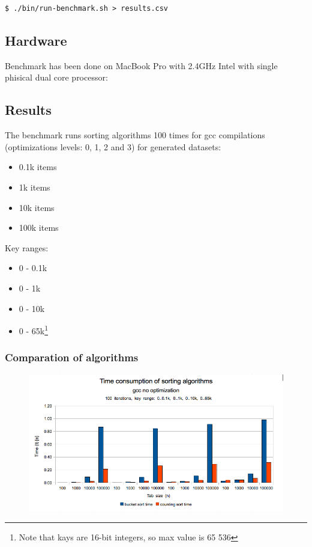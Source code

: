 \documentclass[12pt]{article}
\begin{document}
\begin{lstlisting}
$ ./bin/run-benchmark.sh > results.csv
\end{lstlisting}

\subsection{Hardware}

Benchmark has been done on MacBook Pro with 2.4GHz Intel with single phisical dual core processor:



\subsection{Results}

The benchmark runs sorting algorithms 100 times for gcc compilations (optimizations levels\cite{man-gcc}: 0, 1, 2 and 3) for generated datasets:

\begin{itemize}[noitemsep]
  \item 0.1k items
  \item 1k items
  \item 10k items
  \item 100k items
\end{itemize}

Key ranges:

\begin{itemize}[noitemsep]
  \item 0 - 0.1k
  \item 0 - 1k
  \item 0 - 10k
  \item 0 - 65k\footnote{Note that kays are 16-bit integers, so max value is 65 536}
\end{itemize}

\subsubsection{Comparation of algorithms}

\begin{figure}[H]
    \centering
    \includegraphics[width=1\textwidth]{compare-gcc-opt0}
\end{figure}
\end{document}
